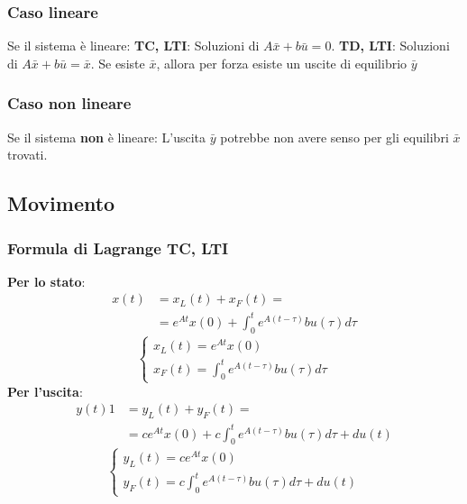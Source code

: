 \begin{landscape}
    \subsubsection*{Caso lineare}
    Se il sistema è lineare:\newline
    \textbf{TC, LTI}: Soluzioni di $A\bar{x} + b \bar{u} = 0$.\newline
    \textbf{TD, LTI}: Soluzioni di $A\bar{x} + b \bar{u} = \bar{x}$.\newline
    Se esiste $\bar{x}$, allora per forza esiste un uscite di equilibrio $\bar{y}$
    \subsubsection*{Caso non lineare}
    Se il sistema \textbf{non} è lineare:\newline
    L'uscita $\bar{y}$ potrebbe non avere senso per gli equilibri $\bar{x}$ trovati. 
    \subsection*{Movimento}
    \subsubsection*{Formula di Lagrange TC, LTI}
    \textbf{Per lo stato}:
    \[
            \begin{split}
            x(t) &= x_L(t) + x_F(t) =\\
            &=e^{At} x(0) + \int_{0}^{t}e^{A(t-\tau)}bu(\tau)d \tau
            \end{split}
    \]
    \[
        \begin{cases}
            x_L(t) = e^{At} x(0)\\
            x_F(t) = \int_{0}^{t}e^{A(t-\tau)}bu(\tau)d \tau
        \end{cases}
    \]
    \textbf{Per l'uscita}:
    \[
            \begin{split}
            y(t) 1 &= y_L(t) + y_F(t) =\\
            &= ce^{At}x(0) + c \int_{0}^{t}e^{A(t-\tau)}bu(\tau)d \tau + du(t)
            \end{split}
    \]
    \[
        \begin{cases}
            y_L(t) = ce^{At}x(0)\\
            y_F(t) = c \int_{0}^{t}e^{A(t-\tau)}bu(\tau)d \tau + du(t)
        \end{cases}
    \]

\end{landscape}
